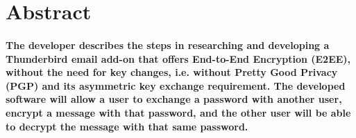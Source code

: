 \newpage
\section{Abstract}

\paragraph{The developer describes the steps in researching and developing a Thunderbird email add-on that offers End-to-End Encryption (E2EE), without the need for key changes, i.e. without Pretty Good Privacy (PGP) and its asymmetric key exchange requirement. The developed software will allow a user to exchange a password with another user, encrypt a message with that password, and the other user will be able to decrypt the message with that same password.}